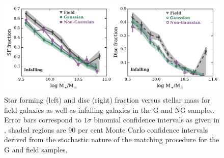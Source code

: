 \documentclass[a4paper,fleqn,usenatbib]{mnras}
\begin{document}
\begin{figure}
  \centering
  \includegraphics[width=\textwidth]{disk_sfFrac95_w2_if.pdf}
  \caption{Star forming (left) and disc (right) fraction versus stellar mass for
    field galaxies as well as infalling galaxies in the G and NG
    samples.  Error bars correspond to $1 \sigma$ binomial confidence
    intervals as given in \citet{cameron2011}, shaded regions are 90
    per cent Monte Carlo confidence intervals derived from the
    stochastic nature of the matching procedure for the G and field samples.}
  \label{fig:disk_sfFrac_if}
\end{figure}
\end{document}
